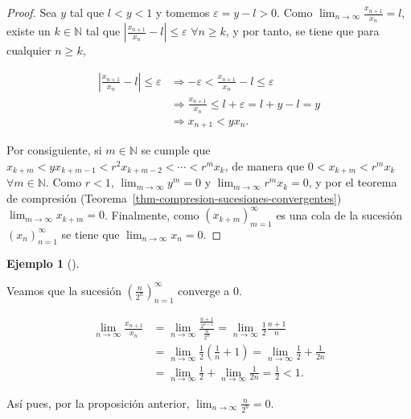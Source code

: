 \documentclass[
  a4paper,
]{scrreport}
\theoremstyle{definition}
\newtheorem{example}{Ejemplo}[chapter]
\theoremstyle{plain}
\theoremstyle{definition}
\theoremstyle{plain}
\theoremstyle{plain}
\theoremstyle{remark}
\begin{document}
\begin{tcolorbox}[enhanced jigsaw, breakable, arc=.35mm, colbacktitle=quarto-callout-note-color!10!white, toptitle=1mm, opacityback=0, colframe=quarto-callout-note-color-frame, colback=white, left=2mm, bottomrule=.15mm, opacitybacktitle=0.6, title=\textcolor{quarto-callout-note-color}{\faInfo}\hspace{0.5em}{Demostración}, toprule=.15mm, titlerule=0mm, coltitle=black, rightrule=.15mm, bottomtitle=1mm, leftrule=.75mm]

\begin{proof}

Sea \(y\) tal que \(l<y<1\) y tomemos \(\varepsilon=y-l>0\). Como
\(\lim_{n\to\infty}\frac{x_{n+1}}{x_n}=l\), existe un \(k\in\mathbb{N}\)
tal que \(|\frac{x_{n+1}}{x_n}-l|\leq \varepsilon\) \(\forall n\geq k\),
y por tanto, se tiene que para cualquier \(n\geq k\),

\begin{align*}
|\frac{x_{n+1}}{x_n}-l|\leq \varepsilon &\Rightarrow
-\varepsilon<\frac{x_{n+1}}{x_n}-l\leq \varepsilon\\ 
&\Rightarrow \frac{x_{n+1}}{x_n}\leq l+\varepsilon=l+y-l=y\\ 
&\Rightarrow x_{n+1}<yx_n.
\end{align*}

Por consiguiente, si \(m\in\mathbb{N}\) se cumple que
\(x_{k+m}<yx_{k+m-1}<r^2x_{k+m-2}<\cdots<r^mx_k\), de manera que
\(0<x_{k+m}<r^mx_k\) \(\forall m\in\mathbb{N}\). Como \(r<1\),
\(\lim_{m\to\infty}y^m=0\) y \(\lim_{m\to\infty}r^mx_k=0\), y por el
teorema de compresión
(Teorema~\ref{thm-compresion-sucesiones-convergentes})
\(\lim_{m\to\infty}x_{k+m}=0\). Finalmente, como
\((x_{k+m})_{m=1}^\infty\) es una cola de la sucesión
\((x_n)_{n=1}^\infty\) se tiene que \(\lim_{n\to\infty}x_n=0\).

\end{proof}

\end{tcolorbox}

\leavevmode{}%
\begin{example}[]\label{exm-limite-cociente-sucesiones}

Veamos que la sucesión \(\left(\frac{n}{2^n}\right)_{n=1}^\infty\)
converge a 0.

\begin{align*}
\lim_{n\to\infty}\frac{x_{n+1}}{x_n} &= \lim_{n\to\infty}\frac{\frac{n+1}{2^{n+1}}}{\frac{n}{2^n}} = \lim_{n\to\infty}\frac{1}{2}\frac{n+1}{n} \\ 
&= \lim_{n\to\infty} \frac{1}{2}\left(\frac{1}{n}+1\right) = \lim_{n\to\infty} \frac{1}{2}+\frac{1}{2n} \\
&= \lim_{n\to\infty} \frac{1}{2} + \lim_{n\to\infty} \frac{1}{2n} = \frac{1}{2}<1.
\end{align*}

Así pues, por la proposición anterior,
\(\lim_{n\to\infty}\frac{n}{2^n} = 0\).

\end{example}
\end{document}
